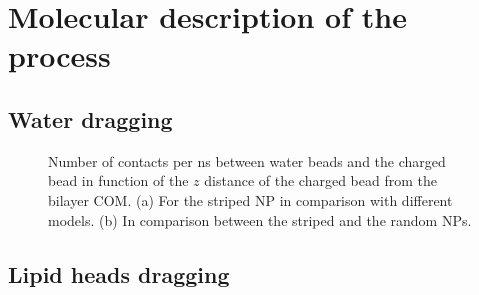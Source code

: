 \chapter{Molecular description of the process}

\section{Water dragging}

\begin{figure}[]
	\center
	\caption{Number of contacts per ns between water beads and the charged bead in function of the $z$ distance of the charged bead from the bilayer \acs{COM}. (a) For the striped \acs{NP} in comparison with different models. (b) In comparison between the striped and the random \acs{NP}s.}
\end{figure}


\section{Lipid heads dragging}

